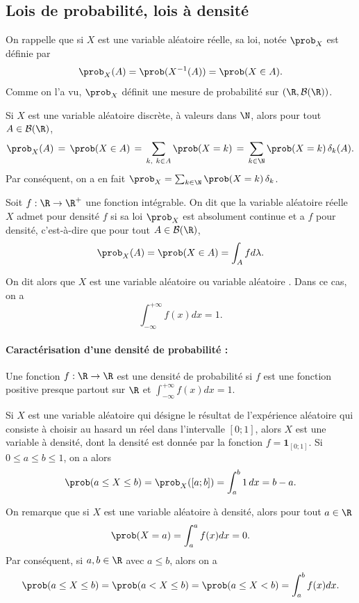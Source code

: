 \subsection{Lois de probabilité, lois à densité}

On rappelle que si $X$ est une variable aléatoire réelle, sa loi, notée $\prob_X$ est définie par
	$$\prob_X(A)=\prob(X^{-1}(A)) = \prob(X\in A).$$
Comme on l'a vu, $\prob_X$ définit une mesure de probabilité sur $(\R,\mathcal{B}(\R))$.

\begin{exemple}{}{}
Si $X$ est une variable aléatoire discrète, à valeurs dans $\N$, alors pour tout $A\in \mathcal{B}(\R)$,
	$$\prob_X(A)\,=\, \prob(X\in A)\,=\, \sum_{k,~k\in A} \prob(X=k) \,=\, \sum_{k\in \N} \prob(X=k) \,\delta_k(A).$$
Par conséquent, on a en fait $\prob_X = \sum_{k\in \N} \prob(X=k)\,\delta_k$.
\end{exemple}

\begin{definition}{}{}
	Soit $f:\R\to \R^+$ une fonction intégrable. On dit que la variable aléatoire réelle $X$ admet pour densité $f$ si sa loi $\prob_X$ est absolument continue et a $f$ pour densité, c'est-à-dire que pour tout $A\in \mathcal{B}(\R)$, 
	$$\prob_X(A) = \prob(X \in A) = \int_A f d\lambda.$$
	
	On dit alors que $X$ est une variable aléatoire  ou variable aléatoire . Dans ce cas, on a $$\int_{-\infty}^{+\infty} f(x) dx = 1.$$
\end{definition}

\paragraph{Caractérisation d'une densité de probabilité : } Une fonction $f:\R\to \R$ est une densité de probabilité si $f$ est une fonction positive presque partout sur $\R$ et 
$\int_{-\infty}^{+\infty} f(x) dx = 1$.

\begin{exemple}{}{}
Si $X$ est une variable aléatoire qui désigne le résultat de l'expérience aléatoire qui consiste à choisir au hasard un réel dans l'intervalle $[0;1]$, alors $X$ est une variable à densité, dont la densité est donnée par la fonction $f = \textbf{1}_{[0;1]}$. Si $0\leq a \leq b \leq 1$, on a alors
	$$\prob(a\leq X \leq b) = \prob_X([a;b]) = \int_a^b 1 \, dx = b-a.$$
\end{exemple}

\vspace{3mm}
On remarque que si $X$ est une variable aléatoire à densité, alors pour tout $a\in \R$
	$$\prob(X=a) = \int_a^a f(x) dx = 0.$$
Par conséquent, si $a, b\in \R$ avec $a\leq b$, alors on a  
$$\prob(a\leq X \leq b) = \prob(a<X\leq b) = \prob(a\leq X < b)  = \int_a^b f(x)dx.$$

